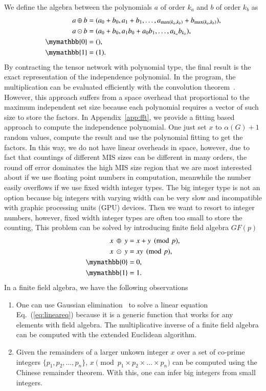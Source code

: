 \documentclass[review,onefignum,onetabnum]{siamart190516}
\newcommand{\<}{\langle}
\renewcommand{\>}{\rangle}
\newcommand{\Eq}[1]{Eq.~(\ref{#1})}
\newcommand{\App}[1]{Appendix~\ref{#1}}
\begin{document}
We define the algebra between the polynomials $a$ of order $k_a$ and $b$ of order $k_b$ as
\begin{align}
    \begin{split}
    a \oplus b &= (a_0 + b_0, a_1 + b_1, \ldots, a_{\max(k_a, k_b)} + b_{\max(k_a, k_b)}),\\
    a \odot b &= (a_0 + b_0, a_1b_0 + a_0b_1, \ldots, a_{k_a} b_{k_b}),\\
    \mymathbb{0} &= (),\\
    \mymathbb{1} &= (1).\label{eq:polynomial}
    \end{split}
\end{align}
By contracting the tensor network with polynomial type, the final result is the exact representation of the independence polynomial.
In the program, the multiplication can be evaluated efficiently with the convolution theorem~\cite{Schonhage1971}.
However, this approach suffers from a space overhead that proportional to the maximum independent set size because each polynomial requires a vector of such size to store the factors.
In \App{app:fft}, we provide a fitting based approach to compute the independence polynomial.
One just set $x$ to $\alpha(G)+1$ random values, compute the result and use the polynomial fitting to get the factors.
In this way, we do not have linear overheads in space, however, 
due to fact that countings of different MIS sizes can be different in many orders, 
the round off error dominates the high MIS size region that we are most interested about if we use floating point numbers in computation, 
meanwhile the number easily overflows if we use fixed width integer types.
The big integer type is not an option because big integers with varying width can be very slow and incompatible with graphic processing units (GPU) devices.
Then we want to resort to integer numbers, however, fixed width integer types are often too small to store the counting,
This problem can be solved by introducing finite field algebra $GF(p)$
\begin{align}
\begin{split}
    x ~\oplus~ y &= x+y\pmod p,\\
    x ~\odot~ y &= xy\pmod p,\\
    \mymathbb{0} &= 0,\\
    \mymathbb{1} &= 1.
\end{split}\label{eq:finitefield}
\end{align}
In a finite field algebra, we have the following observations
\begin{enumerate}
    \item One can use Gaussian elimination~\cite{Golub2013} to solve a linear equation \Eq{eq:lineareq}
    because it is a generic function that works for any elements with field algebra.
    The multiplicative inverse of a finite field algebra can be computed with the extended Euclidean algorithm.
    \item Given the remainders of a larger unkown integer $x$ over a set of co-prime integers $\{p_1, p_2, \ldots, p_n\}$,
    $x \pmod {p_1 \times p_2 \times \ldots \times p_n}$ can be computed using the Chinese remainder theorem.
    With this, one can infer big integers from small integers.
\end{enumerate}
\end{document}
